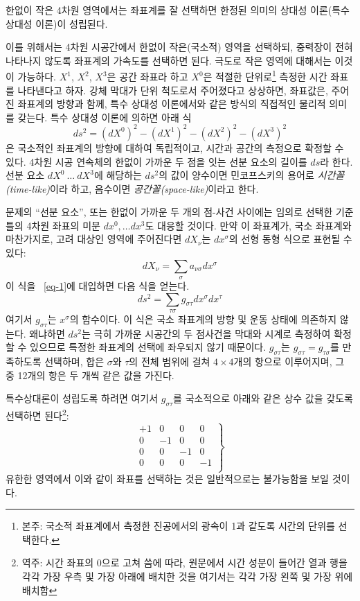 \documentclass[b5paper]{article}
\begin{document}
한없이 작은 4차원 영역에서는 좌표계를 잘 선택하면 한정된 의미의 상대성 이론(특수 상대성 이론)이 성립된다.

이를 위해서는 4차원 시공간에서 한\-없이 작은(국소적) 영역을 선택하되, 중력장이 전혀 나타나지 않도록 좌표계의 가속도를 선택하면 된다. 극도로 작은 영역에 대해서는 이것이 가능하다. $X^1$, $X^2$, $X^3$은 공간 좌표라 하고 $X^0$은 적절한 단위로\footnote{본주: 국소적 좌표계에서 측정한 진공에서의 광속이 1과 같도록 시간의 단위를 선택한다.}  측정한 시간 좌표를 나타낸다고 하자. 강체 막대가 단위 척도로서 주어졌다고 상상하면, 좌표값은, 주어진 좌표계의 방향과 함께, 특수 상대성 이론에서와 같은 방식의 직접적인 물리적 의미를 갖는다. 특수 상대성 이론에 의하면 아래 식
\begin{equation} \label{eq-1}
ds^2 = \left(dX^0\right)^2 - \left(dX^1\right)^2 - \left(dX^2\right)^2 - \left(dX^3\right)^2
\end{equation}
은 국소적인 좌표계의 방향에 대하여 독립적이고, 시간과 공간의 측정으로 확정할 수 있다. 4차원 시공 연속체의 한\-없이 가까운 두 점을 잇는 선분 요소의 길이를 $ds$라 한다. 선분 요소 $dX^0~\dots~dX^3$에 해당하는 $ds^2$의 값이 양수이면 민코프스키의 용어로 \emph{시간꼴(time-like)}이라 하고, 음수이면 \emph{공간꼴(space-like)}이라고 한다.

문제의 ``선분 요소'', 또는 한없이 가까운 두 개의 점-사건 사이에는 임의로 선택한 기준틀의 4차원 좌표의 미분 $ dx^0,\dots dx^3  $도 대응할 것이다. 만약 이 좌표계가, 국소 좌표계와 마찬가지로, 고려 대상인 영역에 주어진다면 $dX_\nu$는 $dx^\sigma$의 선형 동형 식으로 표현될 수 있다:
\begin{equation} \label{eq-2} dX_{\nu} = \sum_{\sigma} a_{\nu\sigma}dx^{\sigma}\end{equation}
이 식을 ~\eqref{eq-1}에 대입하면 다음 식을 얻는다.
\begin{equation} \label{eq-3} ds^2 = \sum_{\tau\sigma} g_{\sigma\tau} dx^{\sigma} dx^{\tau}\end{equation}
여기서 $g_{\sigma\tau}$는 $x^\sigma$의 함수이다. 이 식은 국소 좌표계의 방향 및 운동 상태에 의존하지 않는다. 왜냐하면 $ds^2$는 극히 가까운 시공간의 두 점사건을 막대와 시계로 측정하여 확정할 수 있으므로 특정한 좌표계의 선택에 좌우되지 않기 때문이다. 
$g_{\sigma\tau}$는 $g_{\sigma\tau}=g_{\tau\sigma}$를 만족하도록 선택하며, 합은 $\sigma$와 $\tau$의 전체 범위에 걸쳐 $4\times4$개의 항으로 이루어지며, 그 중 12개의 항은 두 개씩 같은 값을 가진다.\par
특수상대론이 성립도록 하려면 여기서 $g_{\sigma\tau}$를 국소적으로 아래와 같은 상수 값을 갖도록 선택하면 된다\footnote{역주: 시간 좌표의 \ind{}\를 0으로 고쳐 씀에 따라, 원문에서 시간 성분이 들어간 열과 행을 각각 가장 우측 및 가장 아래에 배치한 것을 여기서는 각각 가장 왼쪽 및 가장 위에 배치함}: 
\begin{equation} \label{eq-4}
\left.\begin{array}{cccc}
	+1 & 0 & 0 & 0 \\
	0 & -1 & 0 & 0 \\
	0 & 0 & -1 & 0 \\
	0 & 0 & 0 & -1 \\
\end{array}\right\} \end{equation}
유한한 영역에서 이와 같이 좌표를 선택하는 것은 일반적으로는 불가능함을 보일 것이다.
\end{document}
